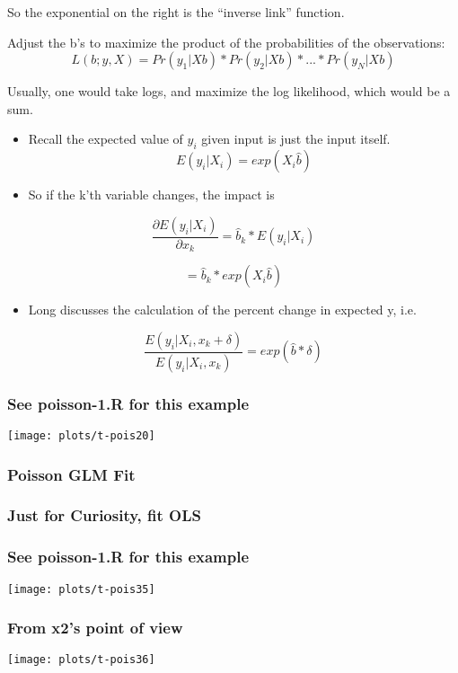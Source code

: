 \documentclass[10pt,english]{beamer}
\def\lyxframeend{} %
\begin{document}
So the exponential on the right is the ``inverse link'' function.


\lyxframeend{}

Adjust the b's to maximize the product of the probabilities of the
observations:
\[
L(b;y,X)=Pr(y_{1}|Xb)*Pr(y_{2}|Xb)*...*Pr(y_{N}|Xb)
\]


Usually, one would take logs, and maximize the log likelihood, which
would be a sum.


\lyxframeend{}
\begin{itemize}
\item Recall the expected value of $y_{i}$ given input is just the input
itself. 
\[
E(y_{i}|X_{i})=exp(X_{i}\hat{b})
\]

\item So if the k'th variable changes, the impact is
\end{itemize}
\[
\frac{\partial E(y_{i}|X_{i})}{\partial x_{k}}=\hat{b}_{k}*E(y_{i}|X_{i})
\]


\[
=\hat{b}_{k}*exp(X_{i}\hat{b})
\]

\begin{itemize}
\item Long discusses the calculation of the percent change in expected y,
i.e.
\end{itemize}
\[
\frac{E(y_{i}|X_{i},x_{k}+\delta)}{E(y_{i}|X_{i},x_{k})}=exp(\hat{b}*\delta)
\]



\lyxframeend{}

\begin{frame}
\frametitle{See poisson-1.R for this example}
\texttt{[image: plots/t-pois20]}
\end{frame}

\begin{frame}[containsverbatim]
\frametitle{Poisson GLM Fit}

\end{frame}

\begin{frame}[containsverbatim]
\frametitle{Just for Curiosity, fit OLS}

\end{frame}

\begin{frame}
\frametitle{See poisson-1.R for this example}

\texttt{[image: plots/t-pois35]}
\end{frame}

\begin{frame}
\frametitle{From x2's point of view}

\texttt{[image: plots/t-pois36]}
\end{frame}
\end{document}
